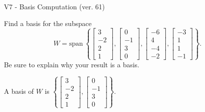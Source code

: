 \begin{exercise}
  \begin{exerciseTitle}V7 - Basis Computation (ver. 61)\end{exerciseTitle}
  \begin{exerciseStatement}
    Find a basis for the subspace 
\[W=\mathrm{span}\ \left\{\left[\begin{array}{r}
3 \\
-2 \\
2 \\
1
\end{array}\right] , \left[\begin{array}{r}
0 \\
-1 \\
3 \\
0
\end{array}\right] , \left[\begin{array}{r}
-6 \\
4 \\
-4 \\
-2
\end{array}\right] , \left[\begin{array}{r}
-3 \\
1 \\
1 \\
-1
\end{array}\right]\right\}.\]
 Be sure to explain why your result is a basis.


  \end{exerciseStatement}
  \begin{exerciseAnswer}
   A basis of \(W\) is  \(\left\{\left[\begin{array}{r}
3 \\
-2 \\
2 \\
1
\end{array}\right] , \left[\begin{array}{r}
0 \\
-1 \\
3 \\
0
\end{array}\right]\right\}\).
  


  \end{exerciseAnswer}
\end{exercise}